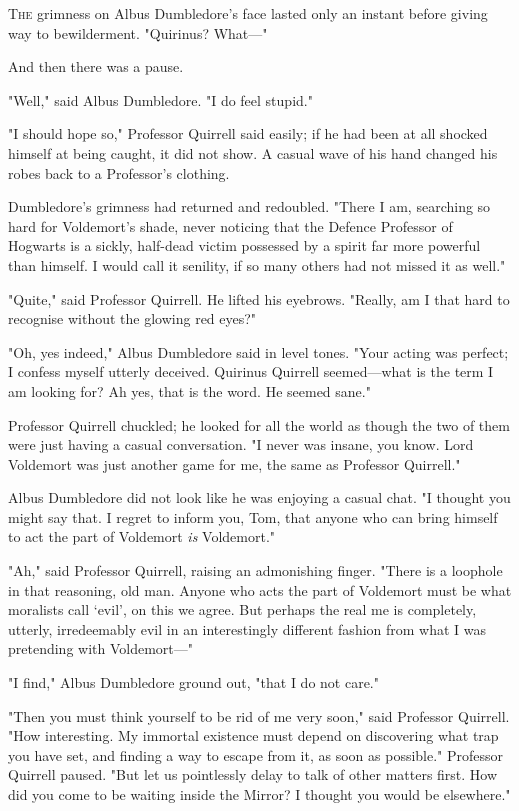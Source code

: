 
\lettrine{T}{he} grimness on Albus Dumbledore’s face lasted only an instant before giving
way to bewilderment. "Quirinus? What—"

And then there was a pause.

"Well," said Albus Dumbledore. "I do feel stupid."

"I should hope so," Professor Quirrell said easily; if he had been at all
shocked himself at being caught, it did not show. A casual wave of his hand
changed his robes back to a Professor’s clothing.

Dumbledore’s grimness had returned and redoubled. "There I am, searching so
hard for Voldemort’s shade, never noticing that the Defence Professor of
Hogwarts is a sickly, half-dead victim possessed by a spirit far more powerful
than himself. I would call it senility, if so many others had not missed it as
well."

"Quite," said Professor Quirrell. He lifted his eyebrows. "Really, am I that
hard to recognise without the glowing red eyes?"

"Oh, yes indeed," Albus Dumbledore said in level tones. "Your acting was
perfect; I confess myself utterly deceived. Quirinus Quirrell seemed—what is
the term I am looking for? Ah yes, that is the word. He seemed sane."

Professor Quirrell chuckled; he looked for all the world as though the two of
them were just having a casual conversation. "I never was insane, you know.
Lord Voldemort was just another game for me, the same as Professor Quirrell."

Albus Dumbledore did not look like he was enjoying a casual chat. "I thought
you might say that. I regret to inform you, Tom, that anyone who can bring
himself to act the part of Voldemort \emph{is} Voldemort."

"Ah," said Professor Quirrell, raising an admonishing finger. "There is a
loophole in that reasoning, old man. Anyone who acts the part of Voldemort must
be what moralists call ‘evil’, on this we agree. But perhaps the real me is
completely, utterly, irredeemably evil in an interestingly different fashion
from what I was pretending with Voldemort—"

"I find," Albus Dumbledore ground out, "that I do not care."

"Then you must think yourself to be rid of me very soon," said Professor
Quirrell. "How interesting. My immortal existence must depend on discovering
what trap you have set, and finding a way to escape from it, as soon as
possible." Professor Quirrell paused. "But let us pointlessly delay to talk of
other matters first. How did you come to be waiting inside the Mirror? I
thought you would be elsewhere."

